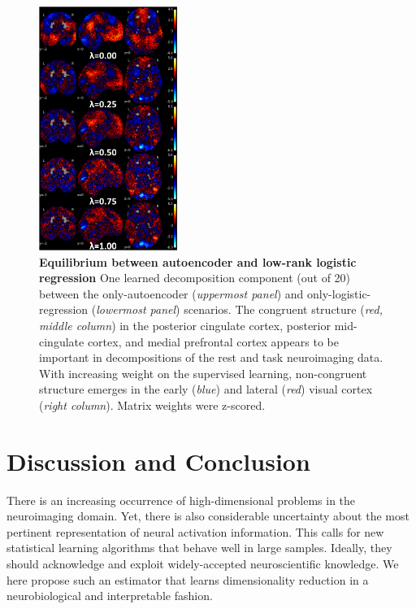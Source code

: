\documentclass{article} %
\begin{document}
\begin{figure}
  \begin{center}
    \includegraphics[width=0.40\textwidth]{figures/figure3.png}
  \end{center}
  \caption {\textbf{
  Equilibrium between autoencoder and low-rank logistic regression}
  One learned decomposition component (out of 20) between the only-autoencoder
  (\textit{uppermost panel}) and only-logistic-regression
  (\textit{lowermost panel}) scenarios.
  The congruent structure (\textit{red, middle column})
  in the
  posterior cingulate cortex, posterior mid-cingulate cortex, and medial
  prefrontal cortex appears to be important in decompositions of the rest and
  task neuroimaging data. With increasing weight on the supervised learning,
  non-congruent structure emerges in the early (\textit{blue}) and
  lateral (\textit{red}) visual cortex
  (\textit{right column}). Matrix weights were z-scored.
  }
\end{figure}


\section{Discussion and Conclusion}
%
There is an increasing occurrence of high-dimensional problems in the
neuroimaging domain. Yet, there is also considerable uncertainty about the
most pertinent representation
of neural activation information.
This calls for new statistical learning algorithms that
behave well in large samples. Ideally, they should acknowledge
and exploit widely-accepted neuroscientific knowledge.
We here propose such an estimator that learns
dimensionality reduction
in a neurobiological and interpretable fashion.
\end{document}

